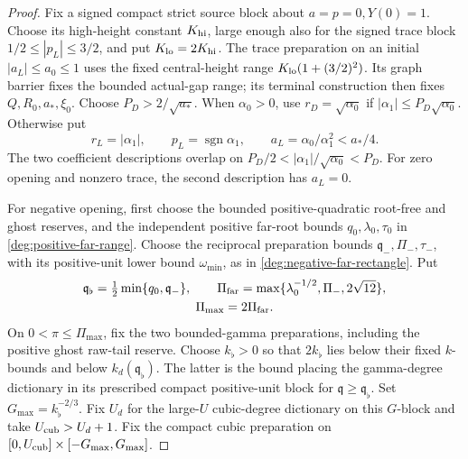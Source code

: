 \begin{proof}
Fix a signed compact strict source block about \(a=p=0,Y(0)=1\).
Choose its high-height constant \(K_{\rm hi}\), large enough also for
the signed trace block \(1/2\le|p_L|\le3/2\), and put
\(K_{\rm lo}=2K_{\rm hi}\). The trace preparation on an initial
\(|a_L|\le a_0\le1\) uses the fixed central-height range
\(K_{\rm lo}(1+(3/2)^2)\). Its graph barrier fixes the bounded
actual-gap range; its terminal construction then fixes
\(Q,R_0,a_*,\xi_0\). Choose \(P_D>2/\sqrt{a_*}\).
When \(\alpha_0>0\), use \(r_D=\sqrt{\alpha_0}\) if
\(|\alpha_1|\le P_D\sqrt{\alpha_0}\). Otherwise put
\[
 r_L=|\alpha_1|,\qquad p_L=\operatorname{sgn}\alpha_1,
 \qquad a_L=\alpha_0/\alpha_1^2<a_*/4.
\]
The two coefficient descriptions overlap on
\(P_D/2<|\alpha_1|/\sqrt{\alpha_0}<P_D\).
For zero opening and nonzero trace, the second description has
\(a_L=0\).

For negative opening, first choose the bounded positive-quadratic
root-free and ghost reserves, and the independent positive far-root
bounds \(q_0,\lambda_0,\tau_0\) in
\eqref{deg:positive-far-range}. Choose the reciprocal preparation
bounds \(\mathfrak q_-,\Pi_-,\tau_-\), with its positive-unit lower
bound \(\omega_{\min}\), as in
\eqref{deg:negative-far-rectangle}. Put
\begin{equation}\label{eq:pure-routing-reserves}
\begin{gathered}
\mathfrak q_\flat=\tfrac12\min\{q_0,\mathfrak q_-\},\qquad
\Pi_{\rm far}=\max\{\lambda_0^{-1/2},\Pi_-,2\sqrt{12}\},\\
\Pi_{\max}=2\Pi_{\rm far}.
\end{gathered}
\end{equation}
On \(0<\pi\le\Pi_{\max}\), fix the two bounded-gamma preparations,
including the positive ghost raw-tail reserve. Choose \(k_\flat>0\)
so that \(2k_\flat\) lies below their fixed \(k\)-bounds and below
\(k_d(\mathfrak q_\flat)\). The latter is the bound placing the
gamma-degree dictionary in its prescribed compact positive-unit block
for \(\mathfrak q\ge\mathfrak q_\flat\). Set
\(G_{\max}=k_\flat^{-2/3}\). Fix \(U_d\) for the large-\(U\)
cubic-degree dictionary on this \(G\)-block and take
\(U_{\rm cub}>U_d+1\). Fix the compact cubic preparation on
\([0,U_{\rm cub}]\times[-G_{\max},G_{\max}]\).


\end{proof}
